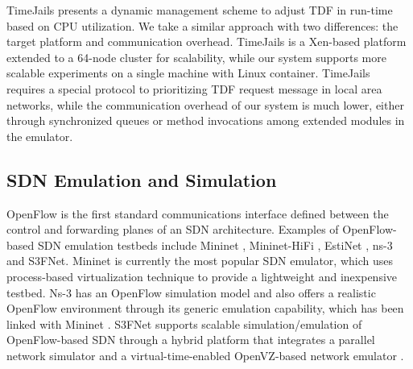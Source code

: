 TimeJails \cite{TimeJails} presents a dynamic management scheme \cite{NtwkEmultAdaptVirtTime} to adjust TDF in run-time based on CPU utilization. 
We take a similar approach with two differences: the target platform and communication overhead. TimeJails is a Xen-based platform extended to a 64-node cluster for scalability, while our system supports more scalable experiments on a single machine with Linux container. TimeJails requires a special protocol to prioritizing TDF request message in local area networks, while the communication overhead of our system is much lower, either through synchronized queues or method invocations among extended modules in the emulator.

\subsection{SDN Emulation and Simulation}
OpenFlow \cite{Openflow} is the first standard communications interface defined between the control and forwarding planes of an SDN architecture. Examples of OpenFlow-based SDN emulation testbeds include Mininet \cite{LaptopSDN}, Mininet-HiFi \cite{ReproNetExprCBE}, EstiNet \cite{EstiNet}, ns-3 \cite{NS-3} and S3FNet\cite{jin2013parallel}.
Mininet is currently the most popular SDN emulator, which uses process-based virtualization technique to provide a lightweight and inexpensive testbed. Ns-3 \cite{NS-3} has an OpenFlow simulation model and also offers a realistic OpenFlow environment through its generic emulation capability, which has been linked with Mininet \cite{MininetLinkNS3}. S3FNet\cite{jin2013parallel} supports scalable simulation/emulation of OpenFlow-based SDN through a hybrid platform that integrates a parallel network simulator and a virtual-time-enabled OpenVZ-based network emulator \cite{S3F_website}. %




